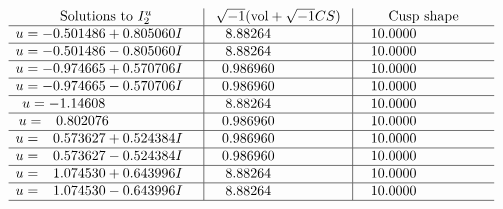 \documentclass[1p]{elsarticle_modified}
\theoremstyle{definition}
\newcommand{\I}{\sqrt{-1}}
\begin{document}
$$\begin{array}{c|c|c}  
\text{Solutions to }I^u_{2}& \I (\text{vol} + \sqrt{-1}CS) & \text{Cusp shape}\\
 \hline 
\begin{aligned}
u &= -0.501486 + 0.805060 I\end{aligned}
 & \phantom{-}8.88264\phantom{ +0.000000I} & \phantom{-}10.0000\phantom{ +0.000000I} \\ \hline\begin{aligned}
u &= -0.501486 - 0.805060 I\end{aligned}
 & \phantom{-}8.88264\phantom{ +0.000000I} & \phantom{-}10.0000\phantom{ +0.000000I} \\ \hline\begin{aligned}
u &= -0.974665 + 0.570706 I\end{aligned}
 & \phantom{-}0.986960\phantom{ +0.000000I} & \phantom{-}10.0000\phantom{ +0.000000I} \\ \hline\begin{aligned}
u &= -0.974665 - 0.570706 I\end{aligned}
 & \phantom{-}0.986960\phantom{ +0.000000I} & \phantom{-}10.0000\phantom{ +0.000000I} \\ \hline\begin{aligned}
u &= -1.14608\phantom{ +0.000000I}\end{aligned}
 & \phantom{-}8.88264\phantom{ +0.000000I} & \phantom{-}10.0000\phantom{ +0.000000I} \\ \hline\begin{aligned}
u &= \phantom{-}0.802076\phantom{ +0.000000I}\end{aligned}
 & \phantom{-}0.986960\phantom{ +0.000000I} & \phantom{-}10.0000\phantom{ +0.000000I} \\ \hline\begin{aligned}
u &= \phantom{-}0.573627 + 0.524384 I\end{aligned}
 & \phantom{-}0.986960\phantom{ +0.000000I} & \phantom{-}10.0000\phantom{ +0.000000I} \\ \hline\begin{aligned}
u &= \phantom{-}0.573627 - 0.524384 I\end{aligned}
 & \phantom{-}0.986960\phantom{ +0.000000I} & \phantom{-}10.0000\phantom{ +0.000000I} \\ \hline\begin{aligned}
u &= \phantom{-}1.074530 + 0.643996 I\end{aligned}
 & \phantom{-}8.88264\phantom{ +0.000000I} & \phantom{-}10.0000\phantom{ +0.000000I} \\ \hline\begin{aligned}
u &= \phantom{-}1.074530 - 0.643996 I\end{aligned}
 & \phantom{-}8.88264\phantom{ +0.000000I} & \phantom{-}10.0000\phantom{ +0.000000I}\\
 \hline 
 \end{array}$$\newpage
\end{document}
